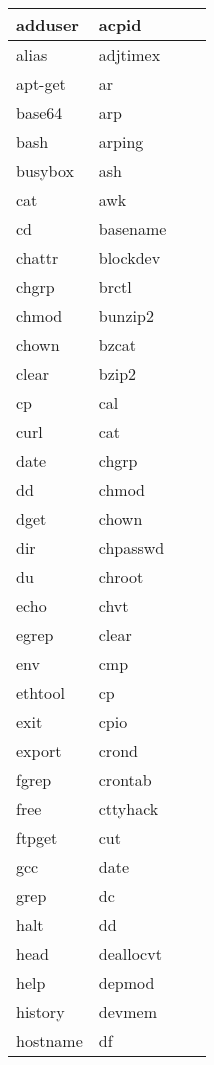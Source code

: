 \begin{longtable}{llp{60mm}p{60mm}}
     adduser & acpid  \\
     \hline
     alias & adjtimex  \\
     \hline
     apt-get & ar  \\
     \hline
     base64 & arp  \\
     \hline
     bash & arping  \\
     \hline
     busybox & ash  \\
     \hline
     cat & awk  \\
     \hline
     cd & basename  \\
     \hline
     chattr & blockdev  \\
     \hline
     chgrp & brctl  \\
     \hline
     chmod & bunzip2  \\
     \hline
     chown & bzcat  \\
     \hline
     clear & bzip2  \\
     \hline
     cp & cal  \\
     \hline
     curl & cat  \\
     \hline
     date & chgrp  \\
     \hline
     dd & chmod  \\
     \hline
     dget & chown  \\
     \hline
     dir & chpasswd \\
     \hline
     du & chroot \\
     \hline
     echo & chvt \\
     \hline
     egrep & clear \\
     \hline
     env & cmp \\
     \hline
     ethtool & cp \\
     \hline
     exit & cpio \\
     \hline
     export & crond \\
     \hline
     fgrep & crontab \\
     \hline
     free & cttyhack \\
     \hline
     ftpget & cut \\
     \hline
     gcc & date \\
     \hline
     grep & dc \\
     \hline
     halt & dd \\
     \hline
     head & deallocvt \\
     \hline
     help & depmod \\
     \hline
     history & devmem \\
     \hline
     hostname & df \\

\end{longtable}
